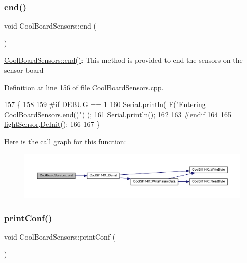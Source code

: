 \subsubsection{\texorpdfstring{end()}{end()}}
{\footnotesize\ttfamily void Cool\+Board\+Sensors\+::end (\begin{DoxyParamCaption}{ }\end{DoxyParamCaption})}

\hyperlink{class_cool_board_sensors_a4902b69f6e628bd6557193758fdd2bae}{Cool\+Board\+Sensors\+::end()}\+: This method is provided to end the sensors on the sensor board 

Definition at line 156 of file Cool\+Board\+Sensors.\+cpp.


\begin{DoxyCode}
157 \{
158 
159 \textcolor{preprocessor}{#if DEBUG == 1  }
160     Serial.println( F(\textcolor{stringliteral}{"Entering CoolBoardSensors.end()"}) );
161     Serial.println();
162 
163 \textcolor{preprocessor}{#endif}
164 
165     \hyperlink{class_cool_board_sensors_ac711c27d0927eb5e73be77f092c48be0}{lightSensor}.\hyperlink{class_cool_s_i114_x_a6840abd53a2e3d71a6bb918077c6d6e6}{DeInit}();
166 
167 \}
\end{DoxyCode}
Here is the call graph for this function\+:\nopagebreak
\begin{figure}[H]
\begin{center}
\leavevmode
\includegraphics[width=350pt]{de/d46/class_cool_board_sensors_a4902b69f6e628bd6557193758fdd2bae_cgraph}
\end{center}
\end{figure}
\mbox{\label{class_cool_board_sensors_af6fd79505815b204c178617ecf54c873}} 
\subsubsection{\texorpdfstring{print\+Conf()}{printConf()}}
{\footnotesize\ttfamily void Cool\+Board\+Sensors\+::print\+Conf (\begin{DoxyParamCaption}{ }\end{DoxyParamCaption})}

